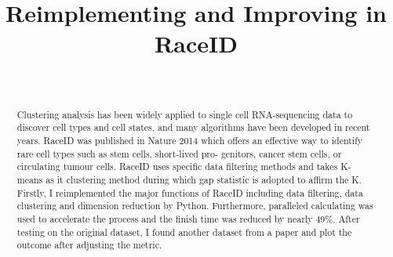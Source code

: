 \documentclass[10pt,journal]{IEEEtran}
\begin{document}
\title{Reimplementing and Improving in RaceID}

\author{\\
} 
\maketitle

\begin{abstract}
Clustering analysis has been widely applied to single cell RNA-sequencing data to discover cell types and cell states, and many algorithms have been developed in recent years. RaceID was published in Nature 2014 which offers an effective way to identify rare cell types such as stem cells, short-lived pro- genitors, cancer stem cells, or circulating tumour cells. RaceID uses specific data filtering methods and takes K-means as it clustering method during which gap statistic is adopted to affirm the K. \\
\hspace*{0.2 cm} Firstly, I reimplemented the major functions of RaceID including data filtering, data clustering and dimension reduction by Python. Furthermore, paralleled calculating was used to accelerate the process and the finish time was reduced by nearly 49\(\%\). After testing on the original dataset, I found another dataset from a paper and plot the outcome after adjusting the metric.
\end{abstract}
\end{document}
